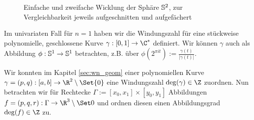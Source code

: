 \documentclass{mythesis}
\begin{document}
\begin{figure}[ht]
    \caption{Einfache und zweifache Wicklung der Sphäre $\S^2$, zur Vergleichbarkeit jeweils aufgeschnitten und aufgefächert}
    \label{fig:spherewinding}
\end{figure}

Im univariaten Fall für $n = 1$ haben wir die Windungszahl für eine stückweise polynomielle, geschlossene Kurve $\gamma: [0,1] \to \C^*$ definiert.
Wir können $\gamma$ auch als Abbildung $\phi: \S^1 \to \S^1$ betrachten, z.B. über $\phi(2^{\pi i t}) := \frac{\gamma(t)}{|\gamma(t)|}$.


Wir konnten im Kapitel \ref{sec:wn_geom} einer polynomiellen Kurve $\gamma = (p,q): [a,b] \to \R^2 \setminus \Set{0}$ eine Windungszahl $\deg(\gamma) \in \Z$ zuordnen.
Nun betrachten wir für Rechtecke $\Gamma := [x_0, x_1] \times [y_0, y_1]$ Abbildungen $f = (p,q,r): \Gamma \to \R^3 \setminus \Set 0$ und ordnen diesen einen Abbildungsgrad $\deg(f) \in \Z$ zu.

\end{document}
